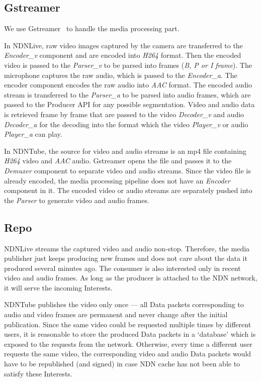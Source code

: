 \subsection{Gstreamer}

We use Gstreamer~\cite{gstreamer} to handle the media processing part. 

In NDNLive, raw video images captured by the camera are transferred to the \textit{Encoder\_v} component and are encoded into \textit{H264} format. Then the encoded video is passed to the \textit{Parser\_v} to be parsed into frames (\textit{B, P or I frame}). The microphone captures the raw audio, which is passed to the \textit{Encoder\_a}. The encoder component encodes the raw audio into \textit{AAC} format. The encoded audio stream is transferred to the \textit{Parser\_a} to be parsed into audio frames, which are passed to the Producer API for any possible segmentation. Video and audio data is retrieved frame by frame that are passed to the video \textit{Decoder\_v} and audio \textit{Decoder\_a} for the decoding into the format which the video \textit{Player\_v} or audio \textit{Player\_a} can play.

In NDNTube, the source for video and audio streams is an mp4 file containing \textit{H264} video and \textit{AAC} audio. Gstreamer opens the file and passes it to the \textit{Demuxer} component to separate video and audio streams. Since the video file is already encoded, the media processing pipeline does not have an \textit{Encoder} component in it. The encoded video or audio streams are separately pushed into the \textit{Parser} to generate video and audio frames.


\subsection{Repo}
\label{sec:repo}
NDNLive streams the captured video and audio non-stop. Therefore, the media publisher just keeps producing new frames and does not care about the data it produced several minutes ago. The consumer is also interested only in recent video and audio frames. As long as the producer is attached to the NDN network, it  will serve the incoming Interests. %

NDNTube publishes the video only once --- all Data packets corresponding to audio and video frames are permanent and never change after the initial publication. Since the same video could be requested multiple times by different users, it is reasonable to store the produced Data packets in a `database' which is exposed to the requests from the network. Otherwise, every time a different user requests the same video, the corresponding video and audio Data packets would have to be republished (and signed) in case NDN cache has not been able to satisfy these Interests.

